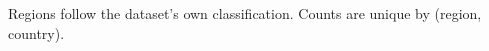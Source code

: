 \begin{table}[!htbp]
\centering
\begin{threeparttable}
\begin{tablenotes}[flushleft]\footnotesize\item Regions follow the dataset's own classification. Counts are unique by (region, country).\end{tablenotes}
\caption{Number of unique countries by region.}
\label{tab:countries_by_region}
\end{threeparttable}
\end{table}
